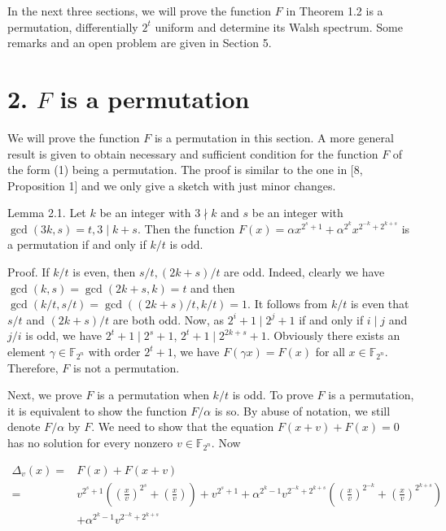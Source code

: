 \documentclass[10pt]{article}
\begin{document}
In the next three sections, we will prove the function $F$ in Theorem 1.2 is a permutation, differentially $2^{t}$ uniform and determine its Walsh spectrum. Some remarks and an open problem are given in Section 5.

\section*{2. $F$ is a permutation}
We will prove the function $F$ is a permutation in this section. A more general result is given to obtain necessary and sufficient condition for the function $F$ of the form (1) being a permutation. The proof is similar to the one in [8, Proposition 1] and we only give a sketch with just minor changes.

Lemma 2.1. Let $k$ be an integer with $3 \nmid k$ and $s$ be an integer with $\operatorname{gcd}(3 k, s)=t, 3 \mid k+s$. Then the function $F(x)=\alpha x^{2^{s}+1}+\alpha^{2^{k}} x^{2^{-k}+2^{k+s}}$ is a permutation if and only if $k / t$ is odd.

Proof. If $k / t$ is even, then $s / t,(2 k+s) / t$ are odd. Indeed, clearly we have $\operatorname{gcd}(k, s)=\operatorname{gcd}(2 k+s, k)=t$ and then $\operatorname{gcd}(k / t, s / t)=\operatorname{gcd}((2 k+s) / t, k / t)=1$. It follows from $k / t$ is even that $s / t$ and $(2 k+s) / t$ are both odd. Now, as $2^{i}+1 \mid 2^{j}+1$ if and only if $i \mid j$ and $j / i$ is odd, we have $2^{t}+1 \mid 2^{s}+1$, $2^{t}+1 \mid 2^{2 k+s}+1$. Obviously there exists an element $\gamma \in \mathbb{F}_{2^{n}}$ with order $2^{t}+1$, we have $F(\gamma x)=F(x)$ for all $x \in \mathbb{F}_{2^{n}}$. Therefore, $F$ is not a permutation.

Next, we prove $F$ is a permutation when $k / t$ is odd. To prove $F$ is a permutation, it is equivalent to show the function $F / \alpha$ is so. By abuse of notation, we still denote $F / \alpha$ by $F$. We need to show that the equation $F(x+v)+F(x)=0$ has no solution for every nonzero $v \in \mathbb{F}_{2^{n}}$. Now

$$
\begin{aligned}
\Delta_{v}(x)= & F(x)+F(x+v) \\
= & v^{2^{s}+1}\left(\left(\frac{x}{v}\right)^{2^{s}}+\left(\frac{x}{v}\right)\right)+v^{2^{s}+1}+\alpha^{2^{k}-1} v^{2^{-k}+2^{k+s}}\left(\left(\frac{x}{v}\right)^{2^{-k}}+\left(\frac{x}{v}\right)^{2^{k+s}}\right) \\
& +\alpha^{2^{k}-1} v^{2^{-k}+2^{k+s}}
\end{aligned}
$$
\end{document}

